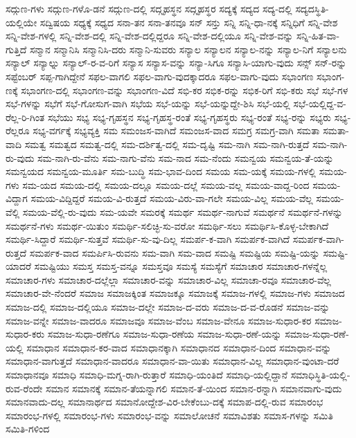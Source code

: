 {ಸದ್ಗುಣ-ಗಳು
ಸದ್ಗುಣ-ಗಳೊ-ಡನೆ
ಸದ್ಗುಣ-ದಲ್ಲಿ
ಸದ್ಗೃಹಸ್ಥನ
ಸದ್ಗೃಹಸ್ಥರ
ಸದ್ಯಕ್ಕೆ
ಸದ್ಯದ
ಸದ್ಯ-ದಲ್ಲಿ
ಸದ್ಯದಸ್ಥಿತಿ-ಯಲ್ಲಿಯೇ
ಸದ್ವಿಷಯ
ಸಧ್ಯಕ್ಕೆ
ಸಧ್ಯದ
ಸನಾ-ತನ
ಸನಾ-ತನವೂ
ಸನ್
ಸನ್ತು
ಸನ್ನಿ
ಸನ್ನಿ-ಧಾ-ನಕ್ಕೆ
ಸನ್ನಿಧಿಗೆ
ಸನ್ನಿ-ವೇಶ
ಸನ್ನಿ-ವೇಶ-ಗಳಲ್ಲಿ
ಸನ್ನಿ-ವೇಶ-ದಲ್ಲಿ
ಸನ್ನಿ-ವೇಶ-ದಲ್ಲಿದ್ದರೂ
ಸನ್ನಿ-ವೇಶ-ದಲ್ಲಿಯೂ
ಸನ್ನಿ-ವೇಶ-ವನ್ನು
ಸನ್ನಿ-ಹಿತ-ವಾ-ಗುತ್ತಿದೆ
ಸನ್ಮಾನ
ಸನ್ಮಾನಿಸಿ
ಸನ್ಮಾನಿಸಿ-ದರು
ಸನ್ಮಾನಿ-ಸುವರು
ಸನ್ಯಾಲ
ಸನ್ಯಾಲನ
ಸನ್ಯಾಲ-ನನ್ನು
ಸನ್ಯಾಲ-ನಿಗೆ
ಸನ್ಯಾಲನು
ಸನ್ಯಾಲ್
ಸನ್ಯಾಲ್ನು
ಸನ್ಯಾಲ್-ರ-ವ-ರಿಗೆ
ಸನ್ಯಾಸ
ಸನ್ಯಾಸ-ವನ್ನು
ಸನ್ಯಾ-ಸಿಗೂ
ಸನ್ಯಾಸಿ-ಯಾಗು-ವುದು
ಸನ್ಸ್
ಸನ್-ರನ್ನು
ಸಪ್ಟೆಂಬರ್
ಸಪ್ಪ-ಗಾಗಿದ್ದೇನೆ
ಸಫಲ-ವಾಗಲಿ
ಸಫಲ-ವಾಗು-ವುದಕ್ಕಾದರೂ
ಸಫಲ-ವಾಗು-ವುದು
ಸಭಾಂಗಣ
ಸಭಾಂಗ-ಣಕ್ಕೆ
ಸಭಾಂಗಣ-ದಲ್ಲಿ
ಸಭಾಂಗಣ-ವನ್ನು
ಸಭಾಂಗಣ-ವಿದೆ
ಸಭಿ-ಕರ
ಸಭಿಕ-ರನ್ನು
ಸಭಿಕ-ರಿಗೆ
ಸಭಿ-ಕರು
ಸಭೆ
ಸಭೆ-ಗಳ
ಸಭೆ-ಗಳನ್ನು
ಸಭೆಗೆ
ಸಭೆ-ಗೋಸುಗ-ವಾಗಿ
ಸಭೆಯ
ಸಭೆ-ಯನ್ನು
ಸಭೆ-ಯನ್ನುದ್ದೇ-ಶಿಸಿ
ಸಭೆ-ಯಲ್ಲಿ
ಸಭೆ-ಯಲ್ಲಿದ್ದ-ವ-ರೆಲ್ಲ-ರಿ-ಗಿಂತ
ಸಭೆಯು
ಸಭ್ಯ
ಸಭ್ಯ-ಗೃಹಸ್ಥನ
ಸಭ್ಯ-ಗೃಹಸ್ಥ-ರಂತೆ
ಸಭ್ಯ-ಗೃಹಸ್ಥರು
ಸಭ್ಯ-ರಂತೆ
ಸಭ್ಯ-ರನ್ನು
ಸಭ್ಯರು
ಸಭ್ಯ-ರೆಲ್ಲರೂ
ಸಭ್ಯ-ವರ್ಗಕ್ಕೆ
ಸಭ್ಯವ್ಯಕ್ತಿ
ಸಮ
ಸಮಂಜಸ-ವಾಗಿದೆ
ಸಮಂಜಸ-ವಾದ
ಸಮಗ್ರ
ಸಮಗ್ರ-ವಾಗಿ
ಸಮತಾ
ಸಮತಾ-ವಾದಿ
ಸಮತ್ವ
ಸಮತ್ವದ
ಸಮತ್ವ-ದಲ್ಲಿ
ಸಮ-ದರ್ಶಿತ್ವ-ದಲ್ಲಿ
ಸಮ-ದೃಷ್ಟಿ
ಸಮ-ನಾಗಿ
ಸಮ-ನಾಗಿ-ರುತ್ತದೆ
ಸಮ-ನಾಗಿ-ರು-ವುದು
ಸಮ-ನಾಗಿ-ರು-ವೆನು
ಸಮ-ನಾಗು-ವೆನು
ಸಮ-ನಾದ
ಸಮ-ನೆಂದು
ಸಮನ್ವಯ
ಸಮನ್ವಯ-ತೆ-ಯನ್ನು
ಸಮನ್ವಯದ
ಸಮನ್ವಯ-ಮೂರ್ತಿ
ಸಮ-ಬುದ್ಧಿ
ಸಮ-ಭಾವ-ದಿಂದ
ಸಮಯ
ಸಮ-ಯಕ್ಕೆ
ಸಮಯ-ಗಳಲ್ಲಿ
ಸಮಯ-ಗಳು
ಸಮ-ಯದ
ಸಮಯ-ದಲ್ಲಿ
ಸಮಯ-ದಲ್ಲೂ
ಸಮಯ-ದಲ್ಲೆ
ಸಮಯ-ವಲ್ಲ
ಸಮಯ-ವಾದ್ದ-ರಿಂದ
ಸಮಯ-ವಿದ್ದಾಗ
ಸಮಯ-ವಿದ್ದಿದ್ದರೆ
ಸಮಯ-ವಿ-ರುತ್ತದೆ
ಸಮಯ-ವಿರು-ವಾ-ಗಲೇ
ಸಮಯ-ವಿಲ್ಲ
ಸಮಯ-ವೆಲ್ಲ
ಸಮಯ-ವೆಲ್ಲಿ
ಸಮಯ-ವೆಲ್ಲಿ-ರು-ವುದು
ಸಮ-ಯವೇ
ಸಮರಕ್ಕೆ
ಸಮರ್ಥ
ಸಮರ್ಥ-ನಾಗುವೆ
ಸಮರ್ಥನೆ
ಸಮರ್ಥನೆ-ಗಳನ್ನು
ಸಮರ್ಥನೆ-ಗಳು
ಸಮರ್ಥ-ಯಿತುಂ
ಸಮರ್ಥಿ-ಸಲಿಚ್ಛಿ-ಸು-ವರೋ
ಸಮರ್ಥಿ-ಸಲು
ಸಮರ್ಥಿಸಿ-ಕೊಳ್ಳ-ಬೇಕಾಗಿದೆ
ಸಮರ್ಥಿ-ಸಿದ್ದಾರೆ
ಸಮರ್ಥಿ-ಸುತ್ತವೆ
ಸಮರ್ಥಿ-ಸು-ವು-ದಿಲ್ಲ
ಸಮರ್ಪ-ಕ-ವಾಗಿ
ಸಮರ್ಪಕ-ವಾಗಿದೆ
ಸಮರ್ಪಕ-ವಾಗಿ-ರುತ್ತದೆ
ಸಮರ್ಪಕ-ವಾದ
ಸಮರ್ಪಿಸಿ-ರುವನು
ಸಮ-ವಾಗಿ
ಸಮ-ವಾದ
ಸಮಷ್ಟಿ
ಸಮಷ್ಟಿಯ
ಸಮಷ್ಟಿ-ಯನ್ನು
ಸಮಷ್ಟಿ-ಯಾದರೆ
ಸಮಷ್ಟಿಯು
ಸಮಸ್ತ
ಸಮಸ್ತ-ವನ್ನೂ
ಸಮಸ್ತವೂ
ಸಮಸ್ಯೆ
ಸಮಸ್ಯೆಗೆ
ಸಮಾಚಾರ
ಸಮಾಚಾರ-ಗಳನ್ನೆಲ್ಲ
ಸಮಾಚಾರ-ಗಳು
ಸಮಾಚಾರ-ದಲ್ಲೆಲ್ಲಾ
ಸಮಾಚಾರ-ವನ್ನು
ಸಮಾಚಾರ-ವಿಲ್ಲ
ಸಮಾಚಾ-ರವೂ
ಸಮಾಚಾರ-ವೆಲ್ಲ
ಸಮಾಚಾರ-ವೇ-ನೆಂದರೆ
ಸಮಾಜ
ಸಮಾಜಕ್ಕಿಂತ
ಸಮಾಜಕ್ಕೂ
ಸಮಾಜಕ್ಕೆ
ಸಮಾಜ-ಗಳಲ್ಲಿ
ಸಮಾಜ-ಗಳು
ಸಮಾಜದ
ಸಮಾಜ-ದಲ್ಲಿ
ಸಮಾಜ-ದಲ್ಲಿಯೂ
ಸಮಾಜ-ದಲ್ಲೇ
ಸಮಾಜ-ದ-ವರು
ಸಮಾಜ-ದ-ವ-ರೊಡನೆ
ಸಮಾಜ-ವನ್ನು
ಸಮಾಜ-ವನ್ನೇ
ಸಮಾಜ-ವಾದರೂ
ಸಮಾಜವೂ
ಸಮಾಜ-ವೆಂಬ
ಸಮಾಜ-ವೇನೂ
ಸಮಾಜ-ಸುಧಾರ-ಕರ
ಸಮಾಜ-ಸುಧಾರ-ಕರು
ಸಮಾಜ-ಸುಧಾ-ರಣೆಗೂ
ಸಮಾಜ-ಸುಧಾ-ರಣೆಯ
ಸಮಾಜ-ಸುಧಾ-ರಣೆ-ಯನ್ನು
ಸಮಾಜ-ಸುಧಾ-ರಣೆ-ಯಲ್ಲಿ
ಸಮಾಧಾನ
ಸಮಾಧಾನ-ಕರ-ವಾದ
ಸಮಾಧಾನಕ್ಕಾಗಿ
ಸಮಾಧಾನದ
ಸಮಾಧಾನ-ದಿಂದ
ಸಮಾಧಾನ-ವನ್ನು
ಸಮಾಧಾನ-ವಾಗುತ್ತದೆ
ಸಮಾಧಾನ-ವಾದರೂ
ಸಮಾಧಾನ-ವಾ-ಯಿತು
ಸಮಾಧಾನ-ವಿಲ್ಲ
ಸಮಾಧಾನ-ವುಂಟಾ-ದರೆ
ಸಮಾಧಾನವೂ
ಸಮಾಧಿ
ಸಮಾಧಿ-ಮಗ್ನ-ರಾಗಿ-ರುತ್ತಾರೆ
ಸಮಾಧಿ-ಯಂತಿದೆ
ಸಮಾಧಿ-ಯಲ್ಲಿದ್ದಾನೆ
ಸಮಾಧಿಸ್ಥಿತಿ-ಯಲ್ಲಿ-ರುವ-ರೆಂದೇ
ಸಮಾನ
ಸಮಾನಕ್ಕೆ
ಸಮಾನ-ತೆಯನ್ನಾಗಲಿ
ಸಮಾನ-ತೆ-ಯಿಂದ
ಸಮಾನ-ರನ್ನಾಗಿ
ಸಮಾನವಾಗು-ವುದು
ಸಮಾನವಾದು-ದಲ್ಲ
ಸಮಾನಾರ್ಥದ
ಸಮಾನೋದ್ದೇಶ-ವಿರ-ಬೇಕೆಂಬು-ದಕ್ಕೆ
ಸಮಾಪ-ದಲ್ಲಿ-ರುವ
ಸಮಾರಂಭ
ಸಮಾರಂಭ-ಗಳಲ್ಲಿ
ಸಮಾರಂಭ-ಗಳು
ಸಮಾರಂಭ-ವನ್ನು
ಸಮಾಲೋಚನೆ
ಸಮಾವಿಶತು
ಸಮಾಸ-ಗಳನ್ನು
ಸಮಿತಿ
ಸಮಿತಿ-ಗಳಿಂದ
}
